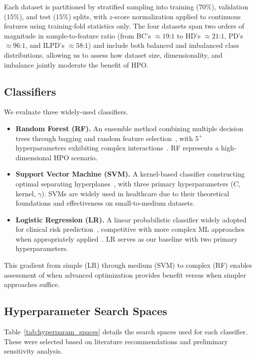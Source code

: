 \documentclass[letterpaper, 10 pt, conference]{ieeeconf}
\begin{document}
Each dataset is partitioned by stratified sampling into training ($70\%$), validation ($15\%$), and test ($15\%$) splits, with $z$-score normalization applied to continuous features using training-fold statistics only. The four datasets span two orders of magnitude in sample-to-feature ratio (from BC's $\approx$$19$:$1$ to HD's $\approx$$21$:$1$, PD's $\approx$$96$:$1$, and ILPD's $\approx$$58$:$1$) and include both balanced and imbalanced class distributions, allowing us to assess how dataset size, dimensionality, and imbalance jointly moderate the benefit of HPO.

\subsection{Classifiers}

We evaluate three widely-used classifiers.
\begin{itemize}
	\item \textbf{Random Forest (RF).} An ensemble method combining multiple decision trees through bagging and random feature selection~\cite{breiman2001}, with $5^+$ hyperparameters exhibiting complex interactions~\cite{probst2019}. RF represents a high-dimensional HPO scenario.
	\item \textbf{Support Vector Machine (SVM).} A kernel-based classifier constructing optimal separating hyperplanes~\cite{vapnik1995}, with three primary hyperparameters ($C$, kernel, $\gamma$). SVMs are widely used in healthcare due to their theoretical foundations and effectiveness on small-to-medium datasets.
	\item \textbf{Logistic Regression (LR).} A linear probabilistic classifier widely adopted for clinical risk prediction~\cite{shipe2019}, competitive with more complex ML approaches when appropriately applied~\cite{lynam2020}. LR serves as our baseline with two primary hyperparameters.
\end{itemize}
This gradient from simple (LR) through medium (SVM) to complex (RF) enables assessment of when advanced optimization provides benefit versus when simpler approaches suffice.

\subsection{Hyperparameter Search Spaces}

Table~\ref{tab:hyperparam_spaces} details the search spaces used for each classifier. These were selected based on literature recommendations and preliminary sensitivity analysis.
\end{document}
